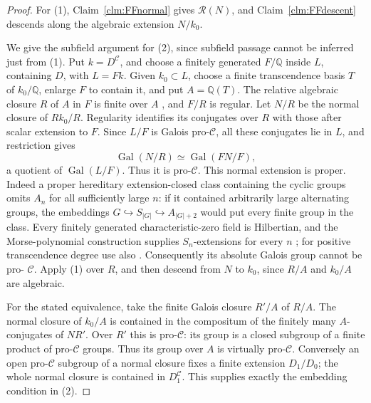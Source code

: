 \begin{proof}
For (1), Claim~\ref{clm:FFnormal} gives \(\mathcal R(N)\),
and Claim~\ref{clm:FFdescent} descends along the algebraic
extension \(N/k_0\).

We give the subfield argument for (2), since subfield passage
cannot be inferred just from (1). Put \(k=D^{\mathcal C}\),
and choose a finitely generated \(F/\mathbb Q\) inside
\(L\), containing \(D\), with \(L=Fk\). Given
\(k_0\subset L\), choose a finite transcendence basis \(T\)
of \(k_0/\mathbb Q\), enlarge \(F\) to contain it, and
put \(A=\mathbb Q(T)\). The relative algebraic closure
\(R\) of \(A\) in \(F\) is finite over \(A\)
\citep[Lemma~9.26.11]{FF_StacksFields}, and \(F/R\) is
regular. Let \(N/R\) be the normal closure of \(Rk_0/R\).
Regularity identifies its conjugates over \(R\) with those
after scalar extension to \(F\). Since \(L/F\) is Galois
pro-\(\mathcal C\), all these conjugates lie in \(L\),
and restriction gives
\[
 \operatorname{Gal}(N/R)
   \simeq\operatorname{Gal}(FN/F),
\]
a quotient of \(\operatorname{Gal}(L/F)\). Thus it is
pro-\(\mathcal C\). This normal extension is proper.
Indeed a proper hereditary extension-closed class containing
the cyclic groups omits \(A_n\) for all sufficiently large
\(n\): if it contained arbitrarily large alternating groups,
the embeddings \(G\hookrightarrow S_{|G|}\hookrightarrow
A_{|G|+2}\) would put every finite group in the class.
Every finitely generated characteristic-zero field is
Hilbertian, and the Morse-polynomial construction supplies
\(S_n\)-extensions for every \(n\)
\citep[Theorems~3.4.1, 4.4.5]{FF_Serre2007}; for positive
transcendence degree use also
\citep[Theorem~1.2]{FF_BarySorokerParan2013}.
Consequently its absolute Galois group cannot be pro-
\(\mathcal C\). Apply (1) over \(R\), and then descend
from \(N\) to \(k_0\), since \(R/A\) and \(k_0/A\)
are algebraic.

For the stated equivalence, take the finite Galois closure
\(R'/A\) of \(R/A\). The normal closure of \(k_0/A\)
is contained in the compositum of the finitely many
\(A\)-conjugates of \(NR'\). Over \(R'\) this is
pro-\(\mathcal C\): its group is a closed subgroup of a
finite product of pro-\(\mathcal C\) groups. Thus its
group over \(A\) is virtually pro-\(\mathcal C\).
Conversely an open pro-\(\mathcal C\) subgroup of a normal
closure fixes a finite extension \(D_1/D_0\); the whole
normal closure is contained in \(D_1^{\mathcal C}\).
This supplies exactly the embedding condition in (2).


\end{proof}
